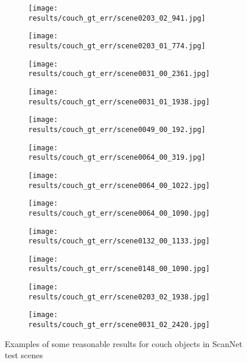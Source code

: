 \begin{figure}[h!]
  \centering
  \begin{subfigure}[b]{0.32\linewidth}
    \texttt{[image: results/couch\_gt\_err/scene0203\_02\_941.jpg]}
  \end{subfigure}
  \begin{subfigure}[b]{0.32\linewidth}
    \texttt{[image: results/couch\_gt\_err/scene0203\_01\_774.jpg]}
  \end{subfigure}
  \begin{subfigure}[b]{0.32\linewidth}
    \texttt{[image: results/couch\_gt\_err/scene0031\_00\_2361.jpg]}
  \end{subfigure}
  \begin{subfigure}[b]{0.32\linewidth}
    \texttt{[image: results/couch\_gt\_err/scene0031\_01\_1938.jpg]}
  \end{subfigure}
  \begin{subfigure}[b]{0.32\linewidth}
    \texttt{[image: results/couch\_gt\_err/scene0049\_00\_192.jpg]}
  \end{subfigure}
  \begin{subfigure}[b]{0.32\linewidth}
    \texttt{[image: results/couch\_gt\_err/scene0064\_00\_319.jpg]}
  \end{subfigure}
  \begin{subfigure}[b]{0.32\linewidth}
    \texttt{[image: results/couch\_gt\_err/scene0064\_00\_1022.jpg]}
  \end{subfigure}
  \begin{subfigure}[b]{0.32\linewidth}
    \texttt{[image: results/couch\_gt\_err/scene0064\_00\_1090.jpg]}
  \end{subfigure}
  \begin{subfigure}[b]{0.32\linewidth}
    \texttt{[image: results/couch\_gt\_err/scene0132\_00\_1133.jpg]}
  \end{subfigure}
  \begin{subfigure}[b]{0.32\linewidth}
    \texttt{[image: results/couch\_gt\_err/scene0148\_00\_1090.jpg]}
  \end{subfigure}
  \begin{subfigure}[b]{0.32\linewidth}
    \texttt{[image: results/couch\_gt\_err/scene0203\_02\_1938.jpg]}
  \end{subfigure}
  \begin{subfigure}[b]{0.32\linewidth}
    \texttt{[image: results/couch\_gt\_err/scene0031\_02\_2420.jpg]}
  \end{subfigure}
  \caption{Examples of some reasonable results for couch objects in ScanNet test scenes}
  \label{fig:result_couch_gt_err}
\end{figure}

